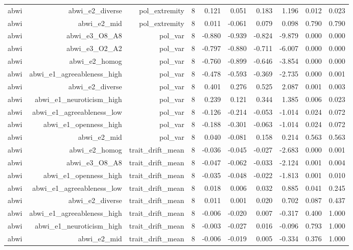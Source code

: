 \documentclass[11pt]{article}
\begin{document}
\begin{landscape}
\begin{longtable}{@{}lrrrrrrrrr@{}}
abwi & abwi\_e2\_diverse & pol\_extremity & 8 & 0.121 & 0.051 & 0.183 & 1.196 & 0.012 & 0.023 \\
abwi & abwi\_e2\_mid & pol\_extremity & 8 & 0.011 & -0.061 & 0.079 & 0.098 & 0.790 & 0.790 \\
abwi & abwi\_e3\_O8\_A8 & pol\_var & 8 & -0.880 & -0.939 & -0.824 & -9.879 & 0.000 & 0.000 \\
abwi & abwi\_e3\_O2\_A2 & pol\_var & 8 & -0.797 & -0.880 & -0.711 & -6.007 & 0.000 & 0.000 \\
abwi & abwi\_e2\_homog & pol\_var & 8 & -0.760 & -0.899 & -0.646 & -3.854 & 0.000 & 0.000 \\
abwi & abwi\_e1\_agreeableness\_high & pol\_var & 8 & -0.478 & -0.593 & -0.369 & -2.735 & 0.000 & 0.001 \\
abwi & abwi\_e2\_diverse & pol\_var & 8 & 0.401 & 0.276 & 0.525 & 2.087 & 0.001 & 0.003 \\
abwi & abwi\_e1\_neuroticism\_high & pol\_var & 8 & 0.239 & 0.121 & 0.344 & 1.385 & 0.006 & 0.023 \\
abwi & abwi\_e1\_agreeableness\_low & pol\_var & 8 & -0.126 & -0.214 & -0.053 & -1.014 & 0.024 & 0.072 \\
abwi & abwi\_e1\_openness\_high & pol\_var & 8 & -0.188 & -0.301 & -0.063 & -1.014 & 0.024 & 0.072 \\
abwi & abwi\_e2\_mid & pol\_var & 8 & 0.040 & -0.081 & 0.158 & 0.214 & 0.563 & 0.563 \\
abwi & abwi\_e2\_homog & trait\_drift\_mean & 8 & -0.036 & -0.045 & -0.027 & -2.683 & 0.000 & 0.001 \\
abwi & abwi\_e3\_O8\_A8 & trait\_drift\_mean & 8 & -0.047 & -0.062 & -0.033 & -2.124 & 0.001 & 0.004 \\
abwi & abwi\_e1\_openness\_high & trait\_drift\_mean & 8 & -0.035 & -0.048 & -0.022 & -1.813 & 0.001 & 0.010 \\
abwi & abwi\_e1\_agreeableness\_low & trait\_drift\_mean & 8 & 0.018 & 0.006 & 0.032 & 0.885 & 0.041 & 0.245 \\
abwi & abwi\_e2\_diverse & trait\_drift\_mean & 8 & 0.011 & 0.001 & 0.020 & 0.702 & 0.087 & 0.437 \\
abwi & abwi\_e1\_agreeableness\_high & trait\_drift\_mean & 8 & -0.006 & -0.020 & 0.007 & -0.317 & 0.400 & 1.000 \\
abwi & abwi\_e1\_neuroticism\_high & trait\_drift\_mean & 8 & -0.003 & -0.027 & 0.016 & -0.096 & 0.793 & 1.000 \\
abwi & abwi\_e2\_mid & trait\_drift\_mean & 8 & -0.006 & -0.019 & 0.005 & -0.334 & 0.376 & 1.000 \\

\end{longtable}
\end{landscape}
\end{document}
